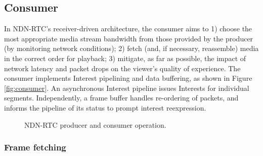 \documentclass{icn/sig-alternate-2013} %
\newcommand{\ndnrtcName}{NDN-RTC} %
\begin{document}
\subsection{Consumer}
\label{sec:consumer}

In \ndnrtcName{}'s receiver-driven architecture, the consumer aims to 1) choose the most appropriate media stream bandwidth from those provided by the producer (by monitoring network conditions); 2) fetch (and, if necessary, reassemble) media in the correct order for playback; 3) mitigate, as far as possible, the impact of network latency and packet drops on the viewer's quality of experience.  
The consumer implements Interest pipelining and data buffering, as shown in Figure \ref{fig:consumer}. An asynchronous Interest pipeline issues Interests for individual segments. Independently, a frame buffer handles re-ordering of packets, and informs the pipeline of its status to prompt interest reexpression.

\begin{figure}[t!]
\centering
{}\qquad
{}
\caption{\ndnrtcName{} producer and consumer operation.}
\end{figure}

\subsubsection{Frame fetching}
\end{document}
